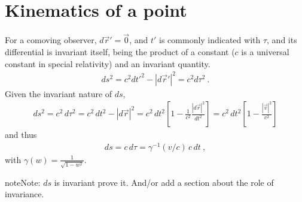 \documentclass[letterpaper,10pt,english]{jupyterBook}
\begin{document}
\section{Kinematics of a point}
\label{\detokenize{ch/relativity-special/notes:kinematics-of-a-point}}\label{\detokenize{ch/relativity-special/notes:relativity-special-notes-kinematics-point}}
\sphinxAtStartPar
{} For a co\sphinxhyphen{}moving observer, \(d \vec{r}' = \vec{0}\), and \(t'\) is commonly indicated with \(\tau\), and its differential is invariant itself, being the product of a constant (\(c\) is a universal constant in special relativity) and an invariant quantity.
\begin{equation*}
\begin{split}d s^2 = c^2 dt'^2 - |d \vec{r}'|^2 = c^2 d \tau^2 \ .\end{split}
\end{equation*}
\sphinxAtStartPar
Given the invariant nature of \(d s\),
\begin{equation*}
\begin{split}d s^2 = c^2 \, d \tau^2 = c^2 \, dt^2 - |d \vec{r}|^2 = c^2 \, dt^2 \left[ 1 - \frac{1}{c^2}\frac{|d\vec{r}|^2}{dt^2} \right] = c^2 \, dt^2 \left[ 1 - \frac{|\vec{v}|^2}{c^2} \right]\end{split}
\end{equation*}
\sphinxAtStartPar
and thus
\begin{equation*}
\begin{split}d s = c \, d \tau = \gamma^{-1}(v/c) \, c \, dt \ ,\end{split}
\end{equation*}
\sphinxAtStartPar
with \(\gamma(w) = \frac{1}{\sqrt{1 - w^2}}\).

\begin{sphinxadmonition}{note}{Note:}
\sphinxAtStartPar
\(ds\) is invariant
 prove it. And/or add a section about the role of invariance.
\end{sphinxadmonition}
\end{document}
